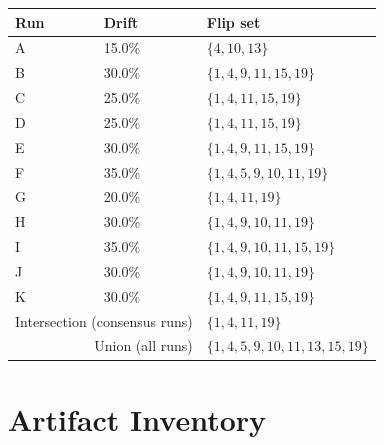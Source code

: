 \documentclass[11pt,a4paper]{article}
\begin{document}
\begin{center}
\small
\begin{tabular}{@{}lll@{}}
\toprule
Run & Drift & Flip set \\
\midrule
A & 15.0\% & $\{4,10,13\}$ \\
B & 30.0\% & $\{1,4,9,11,15,19\}$ \\
C & 25.0\% & $\{1,4,11,15,19\}$ \\
D & 25.0\% & $\{1,4,11,15,19\}$ \\
E & 30.0\% & $\{1,4,9,11,15,19\}$ \\
F & 35.0\% & $\{1,4,5,9,10,11,19\}$ \\
G & 20.0\% & $\{1,4,11,19\}$ \\
H & 30.0\% & $\{1,4,9,10,11,19\}$ \\
I & 35.0\% & $\{1,4,9,10,11,15,19\}$ \\
J & 30.0\% & $\{1,4,9,10,11,19\}$ \\
K & 30.0\% & $\{1,4,9,11,15,19\}$ \\
\midrule
\multicolumn{2}{r}{Intersection (consensus runs)} & $\{1,4,11,19\}$ \\
\multicolumn{2}{r}{Union (all runs)} & $\{1,4,5,9,10,11,13,15,19\}$ \\
\bottomrule
\end{tabular}
\end{center}

\section{Artifact Inventory}
\end{document}
